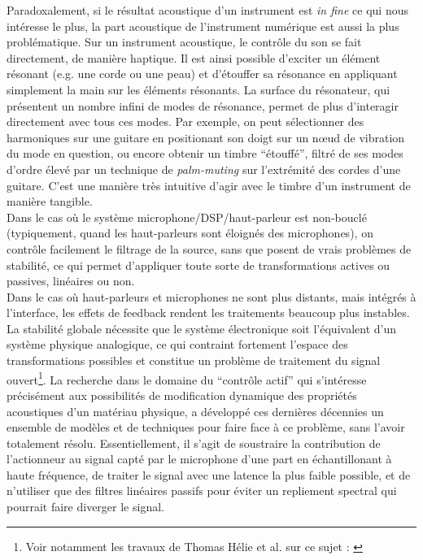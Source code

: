 \indent Paradoxalement, si le résultat acoustique d'un instrument est \textit{in fine} ce qui nous intéresse le plus, la part acoustique de l'instrument numérique est aussi la plus problématique. Sur un instrument acoustique, le contrôle du son se fait directement, de manière haptique. Il est ainsi possible d'exciter un élément résonant (e.g. une corde ou une peau) et d'étouffer sa résonance en appliquant simplement la main sur les éléments résonants. La surface du résonateur, qui présentent un nombre infini de modes de résonance, permet de plus d'interagir directement avec tous ces modes. Par exemple, on peut sélectionner des harmoniques sur une guitare en positionant son doigt sur un nœud de vibration du mode en question, ou encore obtenir un timbre ``étouffé'', filtré de ses modes d'ordre élevé par un technique de \textit{palm-muting} sur l'extrémité des cordes d'une guitare. C'est une manière très intuitive d'agir avec le timbre d'un instrument de manière tangible.\\
\indent Dans le cas où le système microphone/DSP/haut-parleur est non-bouclé (typiquement, quand les haut-parleurs sont éloignés des microphones), on contrôle facilement le filtrage de la source, sans que posent de vrais problèmes de stabilité, ce qui permet d'appliquer toute sorte de transformations actives ou passives, linéaires ou non.\\
\indent Dans le cas où haut-parleurs et microphones ne sont plus distants, mais intégrés à l'interface, les effets de feedback rendent les traitements beaucoup plus instables. La stabilité globale nécessite que le système électronique soit l'équivalent d'un système physique analogique\cite{berdahl_feedback_2012}, ce qui contraint fortement l'espace des transformations possibles et constitue un problème de traitement du signal ouvert\footnote{Voir notamment les travaux de Thomas Hélie et al. sur ce sujet : \cite{muller_power-balanced_2018, falaize_passive_2018, muller_minimal_2019}}. La recherche dans le domaine du ``contrôle actif'' qui s'intéresse précisément aux possibilités de modification dynamique des propriétés acoustiques d'un matériau physique, a développé ces dernières décennies un ensemble de modèles \cite{boutin_active_2011, benacchio_mode_2015, meurisse_active_2015, pardue_separating_2019} et de techniques pour faire face à ce problème, sans l'avoir totalement résolu. Essentiellement, il s'agit de soustraire la contribution de l'actionneur au signal capté par le microphone d'une part en échantillonant à haute fréquence, de traiter le signal avec une latence la plus faible possible, et de n'utiliser que des filtres linéaires passifs pour éviter un repliement spectral qui pourrait faire diverger le signal.\\
